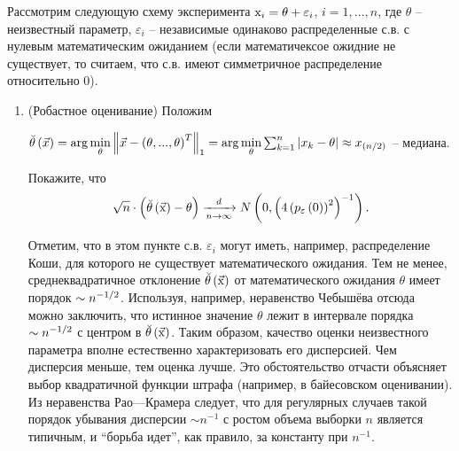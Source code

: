 \begin{problem} 
Рассмотрим следующую схему эксперимента ${\rm x}_{i} =\theta +\varepsilon _{i} $, $i=1,...,n$, где $\theta $ -- неизвестный параметр, $\varepsilon _{i} $ -- независимые одинаково распределенные с.в. с нулевым математическим ожиданием (если математичексое ожидние не существует, то считаем, что с.в. имеют симметричное распределение относительно 0).

\begin{enumerate}
\item (Робастное оценивание) 
Положим 

\noindent $\breve{\theta }\left(\vec{x}\right)=\arg \mathop{\min }\limits_{\theta } \left\| \vec{x}-\left(\theta ,...,\theta \right)^{T} \right\| _{1} =\arg \mathop{\min }\limits_{\theta } \sum _{k=1}^{n}\left|x_{k} -\theta \right| \approx x_{\left({n\mathord{\left/ {\vphantom {n 2}} \right. \kern-\nulldelimiterspace} 2} \right)} $ -- медиана.
\begin{comment}
САША, ВСПОМНИТЕ ЧТО ГВОРИЛ СПОКОЙНЫЙ
\end{comment}
\noindent Покажите, что
\[\sqrt{n} \cdot \left(\breve{\theta }\left(\vec{{\rm x}}\right)-\theta \right)\xrightarrow[{n\to \infty }]{d} N\left(0,\left(4\left(p_{\varepsilon } \left(0\right)\right)^{2} \right)^{-1} \right).\] 

\begin{remark} 
Отметим, что в этом  пункте с.в. $\varepsilon _{i} $ могут иметь, например, распределение Коши, для которого не существует математического ожидания. Тем не менее, среднеквадратичное отклонение $\breve{\theta }\left(\vec{{\rm x}}\right)$ от математического ожидания $\theta $ имеет порядок $\sim n^{-{1\mathord{\left/ {\vphantom {1 2}} \right. \kern-\nulldelimiterspace} 2} } $. Используя, например, неравенство Чебышёва отсюда можно заключить, что истинное значение $\theta $ лежит в интервале порядка $\sim n^{-{1\mathord{\left/ {\vphantom {1 2}} \right. \kern-\nulldelimiterspace} 2} } $ с центром в $\breve{\theta }\left(\vec{{\rm x}}\right)$. Таким образом, качество оценки неизвестного параметра вполне естественно характеризовать его дисперсией. Чем дисперсия меньше, тем оценка лучше. Это обстоятельство отчасти объясняет выбор квадратичной функции штрафа (например, в байесовском оценивании). Из неравенства Рао---Крамера следует, что для регулярных случаев такой  порядок убывания дисперсии $\sim n^{-1} $ с ростом объема выборки $n$ является типичным, и ``борьба идет'', как правило, за константу при  $n^{-1} $.
\end{remark}


\end{enumerate}
\end{problem}
